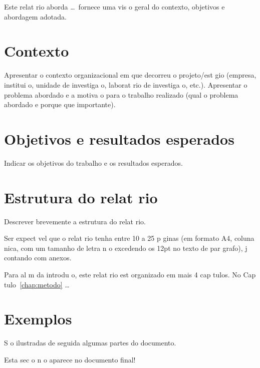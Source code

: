 \documentclass{article}
\begin{document}
Este relat rio aborda \ldots\ fornece uma vis o geral do contexto, objetivos e abordagem adotada.

\section{Contexto}

\begin{info}
   Apresentar o contexto organizacional em que decorreu o projeto/est gio (empresa, institui o, unidade de investiga o, laborat rio de investiga o, etc.). 
   Apresentar o problema abordado e a motiva o para o trabalho realizado (qual   o problema abordado e porque   que   importante).
\end{info}

\section{Objetivos e resultados esperados}

\begin{info}
  Indicar os objetivos do trabalho e os resultados esperados.
\end{info}

\section{Estrutura do relat rio}
	
\begin{info}
  Descrever brevemente a estrutura do relat rio.

  Ser  expect vel que o relat rio tenha entre 10 a 25 p ginas (em formato A4, coluna  nica, com um tamanho de letra n o excedendo os 12pt no texto de par grafo), j  contando com anexos. 
\end{info}

Para al m da introdu o, este relat rio est  organizado em mais 4 cap tulos.
No Cap tulo~\ref{chap:metodo} \ldots


\newpage  %
\section*{Exemplos}


\begin{info}
  S o ilustradas de seguida algumas partes do documento.

  Esta sec o n o aparece no documento final!
\end{info}
\end{document}
